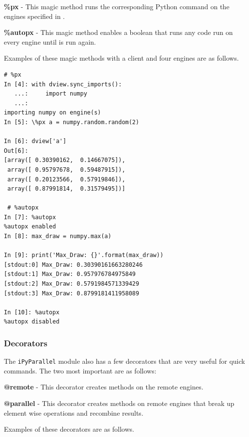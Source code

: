 \begin{list}{}{}
\item \textbf{\%px} - This magic method runs the corresponding Python command on the engines specified in .
\item \textbf{\%autopx} - This magic method enables a boolean that runs any code run on every engine until  is run again.
\end{list}

Examples of these magic methods with a client and four engines are as follows.

\begin{lstlisting}
# %px
In [4]: with dview.sync_imports():
   ...:     import numpy
   ...:     
importing numpy on engine(s)
In [5]: \%px a = numpy.random.random(2)

In [6]: dview['a']
Out[6]: 
[array([ 0.30390162,  0.14667075]),
 array([ 0.95797678,  0.59487915]),
 array([ 0.20123566,  0.57919846]),
 array([ 0.87991814,  0.31579495])]
 
 # %autopx
In [7]: %autopx
%autopx enabled
In [8]: max_draw = numpy.max(a)

In [9]: print('Max_Draw: {}'.format(max_draw))
[stdout:0] Max_Draw: 0.30390161663280246
[stdout:1] Max_Draw: 0.957976784975849
[stdout:2] Max_Draw: 0.5791984571339429
[stdout:3] Max_Draw: 0.8799181411958089

In [10]: %autopx
%autopx disabled
\end{lstlisting}
\subsubsection*{Decorators}
The \texttt{iPyParallel} module also has a few decorators that are very useful for quick commands.
The two most important are as follows:

\begin{list}{}{}
\item \textbf{@remote} - This decorator creates methods on the remote engines.
\item \textbf{@parallel} - This decorator creates methods on remote engines that break up element wise operations and recombine results.
\end{list}

Examples of these decorators are as follows.

